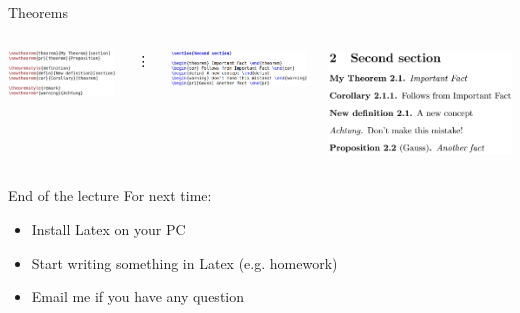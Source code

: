 \documentclass[11pt]{beamer}
\begin{document}
\begin{frame}{Theorems}
  \begin{columns}
      \includegraphics[scale=0.3]{img/thm_pre.png}

      \vspace{0.2cm}
      \vdots
      \vspace{0.3cm}

      \includegraphics[scale=0.3]{img/thm_tex.png}

      \includegraphics[scale=0.2]{img/thm_pdf.png}

      \vspace{1cm}
  \end{columns}
\end{frame}

\begin{frame}{End of the lecture}
  For next time:

  \vspace{0.8cm}
  \begin{itemize}
    \item Install Latex on your PC
    \item Start writing something in Latex (e.g. homework)
    \item Email me if you have any question
  \end{itemize}
\end{frame}
\end{document}
